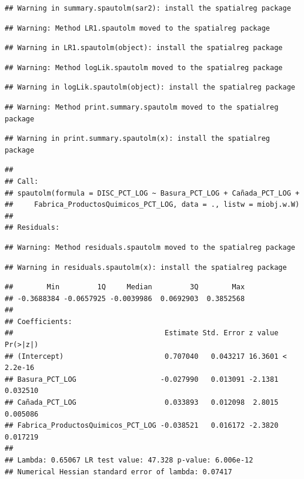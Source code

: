 \documentclass[11pt,]{article}
\begin{document}
\begin{verbatim}
## Warning in summary.spautolm(sar2): install the spatialreg package
\end{verbatim}

\begin{verbatim}
## Warning: Method LR1.spautolm moved to the spatialreg package
\end{verbatim}

\begin{verbatim}
## Warning in LR1.spautolm(object): install the spatialreg package
\end{verbatim}

\begin{verbatim}
## Warning: Method logLik.spautolm moved to the spatialreg package
\end{verbatim}

\begin{verbatim}
## Warning in logLik.spautolm(object): install the spatialreg package
\end{verbatim}

\begin{verbatim}
## Warning: Method print.summary.spautolm moved to the spatialreg package
\end{verbatim}

\begin{verbatim}
## Warning in print.summary.spautolm(x): install the spatialreg package
\end{verbatim}

\begin{verbatim}
## 
## Call: 
## spautolm(formula = DISC_PCT_LOG ~ Basura_PCT_LOG + Cañada_PCT_LOG + 
##     Fabrica_ProductosQuimicos_PCT_LOG, data = ., listw = miobj.w.W)
## 
## Residuals:
\end{verbatim}

\begin{verbatim}
## Warning: Method residuals.spautolm moved to the spatialreg package
\end{verbatim}

\begin{verbatim}
## Warning in residuals.spautolm(x): install the spatialreg package
\end{verbatim}

\begin{verbatim}
##        Min         1Q     Median         3Q        Max 
## -0.3688384 -0.0657925 -0.0039986  0.0692903  0.3852568 
## 
## Coefficients: 
##                                    Estimate Std. Error z value  Pr(>|z|)
## (Intercept)                        0.707040   0.043217 16.3601 < 2.2e-16
## Basura_PCT_LOG                    -0.027990   0.013091 -2.1381  0.032510
## Cañada_PCT_LOG                     0.033893   0.012098  2.8015  0.005086
## Fabrica_ProductosQuimicos_PCT_LOG -0.038521   0.016172 -2.3820  0.017219
## 
## Lambda: 0.65067 LR test value: 47.328 p-value: 6.006e-12 
## Numerical Hessian standard error of lambda: 0.07417
\end{verbatim}
\end{document}
